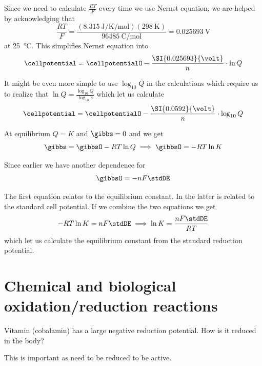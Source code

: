 \documentclass[../mit-general-chemistry.tex]{subfiles}
\begin{document}
Since we need to calculate $\frac{RT}{F}$ every time we use Nernst
equation, we are helped by acknowledging that
\begin{equation*}
  \frac{RT}{F} = \frac{(\SI{8.315}{\joule\per\kelvin\per\mol})(\SI{298}{\kelvin})}{\SI{96485}{\coulomb\per\mol}}
  = \SI{0.025693}{\volt}
\end{equation*}
at \SI{25}{\celsius}. This simplifies Nernst equation into
\begin{equation}
  \cellpotential = \cellpotentialO - \frac{\SI{0.025693}{\volt}}{n} \cdot\ln Q
\end{equation}

It might be even more simple to use $\log_{10} Q$ in the calculations
which require us to realize that $\ln Q = \frac{\log_{10} Q}{\log_{10}
  e}$ which let us calculate
\begin{equation}
  \cellpotential = \cellpotentialO - \frac{\SI{0.0592}{\volt}}{n} \cdot\log_{10} Q
\end{equation}



At equilibrium $Q = K$ and $\gibbs = 0$ and we get
\begin{equation*}
  \gibbs = \gibbsO - RT \ln Q \implies \gibbsO = - RT \ln K
\end{equation*}

Since earlier we have another dependence for \gibbsO
\begin{equation}
  \gibbsO = -nF\stdDE
\end{equation}

The first equation relates \gibbsO to the equilibrium constant. In the
latter \gibbsO is related to the standard cell potential. If we
combine the two equations we get
\begin{equation}
  -RT \ln K = nF\stdDE \implies \ln K = \frac{nF\stdDE}{RT}
\end{equation}
which let us calculate the equilibrium constant from the standard
reduction potential.




\section{Chemical and biological oxidation/reduction reactions}


Vitamin  (cobalamin) has a large negative reduction potential. How is it
reduced in the body?

This is important as  need to be reduced to be active.
\end{document}
